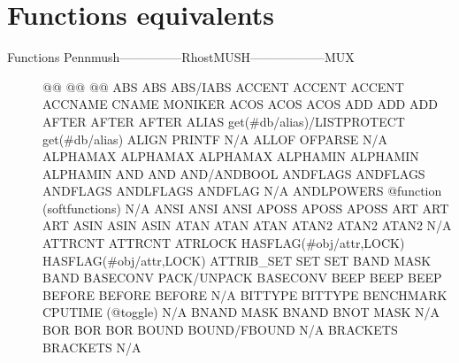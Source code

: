 \documentclass[letterpaper,10pt,english]{sphinxmanual}
\begin{document}
\section{Functions equivalents}
\label{\detokenize{differences:functions-equivalents}}\begin{description}
\item[{Functions Pennmush—————\sphinxhyphen{}RhostMUSH——————\textendash{}MUX}] \leavevmode
\sphinxAtStartPar
@@                      @@                           @@
ABS                     ABS                          ABS/IABS
ACCENT                  ACCENT                       ACCENT
ACCNAME                 CNAME                        MONIKER
ACOS                    ACOS                         ACOS
ADD                     ADD                          ADD
AFTER                   AFTER                        AFTER
ALIAS                   get(\#db/alias)/LISTPROTECT   get(\#db/alias)
ALIGN                   PRINTF                       N/A
ALLOF                   OFPARSE                      N/A
ALPHAMAX                ALPHAMAX                     ALPHAMAX
ALPHAMIN                ALPHAMIN                     ALPHAMIN
AND                     AND                          AND/ANDBOOL
ANDFLAGS                ANDFLAGS                     ANDFLAGS
ANDLFLAGS               ANDFLAG                      N/A
ANDLPOWERS              @function (softfunctions)    N/A
ANSI                    ANSI                         ANSI
APOSS                   APOSS                        APOSS
ART                     ART                          ART
ASIN                    ASIN                         ASIN
ATAN                    ATAN                         ATAN
ATAN2                   ATAN2                        ATAN2
N/A                     ATTRCNT                      ATTRCNT
ATRLOCK                 HASFLAG(\#obj/attr,LOCK)      HASFLAG(\#obj/attr,LOCK)
ATTRIB\_SET              SET                          SET
BAND                    MASK                         BAND
BASECONV                PACK/UNPACK                  BASECONV
BEEP                    BEEP                         BEEP
BEFORE                  BEFORE                       BEFORE
N/A                     BITTYPE                      BITTYPE
BENCHMARK               CPUTIME (@toggle)            N/A
BNAND                   MASK                         BNAND
BNOT                    MASK                         N/A
BOR                     BOR                          BOR
BOUND                   BOUND/FBOUND                 N/A
BRACKETS                BRACKETS                     N/A

\end{description}
\end{document}
